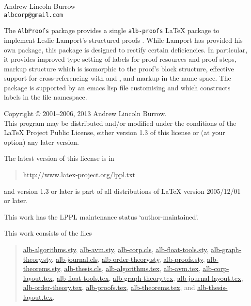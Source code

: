 \documentclass[11pt,a4paper,oneside,titlepage]{alb-corp}
\begin{document}



\begin{albTitlePage}


  Andrew Lincoln Burrow\\
  \texttt{albcorp@gmail.com}



  The \texttt{AlbProofs} package provides a single \texttt{alb-proofs}
  \LaTeX{} package to implement Leslie Lamport's structured proofs
  \citep{lamport93:_how_write_proof}.  While Lamport has provided his
  own package, this package is designed to rectify certain deficiencies.
  In particular, it provides improved type setting of labels for proof
  resources and proof steps, markup structure which is isomorphic to the
  proof's block structure, effective support for cross-referencing with
  \AUCTeX{} and \RefTeX{}, and markup in the \albLogo{} name space.  The
  package is supported by an emacs lisp file customising \AUCTeX{} and
  \RefTeX{} which constructs labels in the file namespace.



  Copyright \copyright{} 2001--2006, 2013 Andrew Lincoln Burrow.\\
  This program may be distributed and/or modified under the conditions
  of the \LaTeX{} Project Public License, either version 1.3 of this
  license or (at your option) any later version.

  \medskip{}

  The latest version of this license is in
  \begin{quote}
    \url{http://www.latex-project.org/lppl.txt}
  \end{quote}
  and version 1.3 or later is part of all distributions of LaTeX version
  2005/12/01 or later.

  \medskip{}

  This work has the LPPL maintenance status `author-maintained'.

  \medskip{}

  This work consists of the files
  \begin{quote}
    \begin{flushleft}
      \url{alb-algorithms.sty}, \url{alb-avm.sty}, \url{alb-corp.cls},
      \url{alb-float-tools.sty}, \url{alb-graph-theory.sty},
      \url{alb-journal.cls}, \url{alb-order-theory.sty},
      \url{alb-proofs.sty}, \url{alb-theorems.sty},
      \url{alb-thesis.cls}, \url{alb-algorithms.tex}, \url{alb-avm.tex},
      \url{alb-corp-layout.tex}, \url{alb-float-tools.tex},
      \url{alb-graph-theory.tex}, \url{alb-journal-layout.tex},
      \url{alb-order-theory.tex}, \url{alb-proofs.tex},
      \url{alb-theorems.tex}, and \url{alb-thesis-layout.tex}.
    \end{flushleft}
  \end{quote}



\end{albTitlePage}
\end{document}
